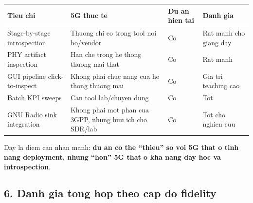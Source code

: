 \documentclass[
  vietnamese,
  a4paper,
  11pt]{article}
\newcounter{none} %
\begin{document}
{\def\LTcaptype{none} %
\begin{longtable}[]{@{}
  >{\raggedright\arraybackslash}p{}
  >{\raggedright\arraybackslash}p{}
  >{\raggedright\arraybackslash}p{}
  >{\raggedright\arraybackslash}p{}@{}}
\toprule\noalign{}
\begin{minipage}[b]{\linewidth}\raggedright
Tieu chi
\end{minipage} & \begin{minipage}[b]{\linewidth}\raggedright
5G thuc te
\end{minipage} & \begin{minipage}[b]{\linewidth}\raggedright
Du an hien tai
\end{minipage} & \begin{minipage}[b]{\linewidth}\raggedright
Danh gia
\end{minipage} \\
\midrule\noalign{}
\endhead
\bottomrule\noalign{}
\endlastfoot
Stage-by-stage introspection & Thuong chi co trong tool noi bo/vendor &
Co & Rat manh cho giang day \\
PHY artifact inspection & Han che trong he thong thuong mai that & Co &
Rat manh \\
GUI pipeline click-to-inspect & Khong phai chuc nang cua he thong thuong
mai & Co & Gia tri teaching cao \\
Batch KPI sweeps & Can tool lab/chuyen dung & Co & Tot \\
GNU Radio sink integration & Khong phai mot phan cua 3GPP, nhung huu ich
cho SDR/lab & Co & Tot cho nghien cuu \\
\end{longtable}
}

Day la diem can nhan manh: \textbf{du an co the ``thieu'' so voi 5G that
o tinh nang deployment, nhung ``hon'' 5G that o kha nang day hoc va
introspection}.

\subsection{6. Danh gia tong hop theo cap do
fidelity}\label{danh-gia-tong-hop-theo-cap-do-fidelity}
\end{document}
